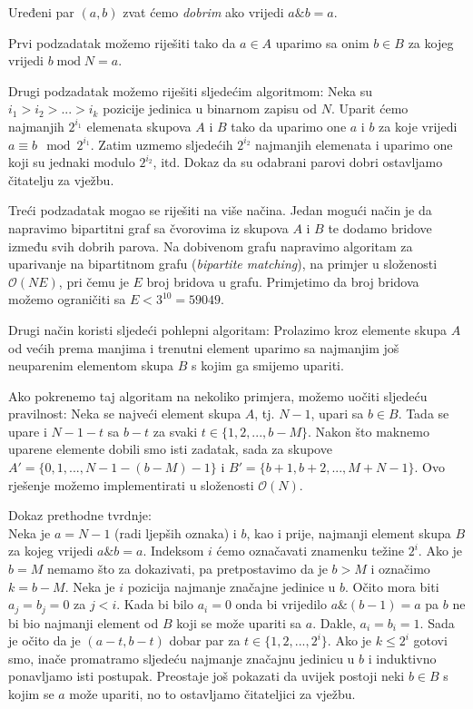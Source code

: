 \documentclass[a4paper]{article}
\begin{document}
Uređeni par $(a, b)$ zvat ćemo \emph{dobrim} ako vrijedi $a \mathbin\& b = a$.

Prvi podzadatak možemo riješiti tako da $a \in A$ uparimo sa onim $b \in B$ za
kojeg vrijedi $b \mathbin{\textrm{mod}} N = a$.

Drugi podzadatak možemo riješiti sljedećim algoritmom: Neka su
$i_1 > i_2 > ... > i_k$ pozicije jedinica u binarnom zapisu od $N$. Uparit ćemo
najmanjih $2^{i_1}$ elemenata skupova $A$ i $B$ tako da uparimo one $a$ i $b$
za koje vrijedi $a \equiv b \mod 2^{i_1}$. Zatim uzmemo sljedećih $2^{i_2}$
najmanjih elemenata i uparimo one koji su jednaki modulo $2^{i_2}$, itd.
Dokaz da su odabrani parovi dobri ostavljamo čitatelju za vježbu.

Treći podzadatak mogao se riješiti na više načina. Jedan mogući način je da
napravimo bipartitni graf sa čvorovima iz skupova $A$ i $B$ te dodamo bridove
između svih dobrih parova. Na dobivenom grafu napravimo algoritam za uparivanje
na bipartitnom grafu (\emph{bipartite matching}), na primjer u složenosti
$\mathcal{O}(NE)$, pri čemu je $E$ broj bridova u grafu.
Primjetimo da broj bridova možemo ograničiti sa $E < 3^{10} = 59049$.

Drugi način koristi sljedeći pohlepni algoritam: Prolazimo kroz elemente skupa
$A$ od većih prema manjima i trenutni element uparimo sa najmanjim još
neuparenim elementom skupa $B$ s kojim ga smijemo upariti.

Ako pokrenemo taj algoritam na nekoliko primjera, možemo uočiti sljedeću
pravilnost: Neka se najveći element skupa $A$, tj. $N - 1$, upari sa $b \in B$.
Tada se upare i $N - 1 - t$ sa $b - t$ za svaki $t \in \{1, 2, ..., b - M\}$.
Nakon što maknemo uparene elemente dobili smo isti zadatak, sada za skupove
$A' = \{0, 1, ..., N - 1 - (b - M) - 1\}$ i
$B' = \{b + 1, b + 2, ..., M + N - 1\}$. Ovo rješenje možemo implementirati u
složenosti $\mathcal{O}(N)$.

Dokaz prethodne tvrdnje:\\
Neka je $a = N - 1$ (radi ljepših oznaka) i $b$, kao i prije, najmanji element
skupa $B$ za kojeg vrijedi $a \mathbin\& b = a$. Indeksom $i$ ćemo označavati znamenku
težine $2^i$. Ako je $b = M$ nemamo što za dokazivati, pa pretpostavimo da je
$b > M$ i označimo $k = b - M$. Neka je $i$ pozicija najmanje značajne jedinice u $b$.
Očito mora biti $a_j = b_j = 0$ za $j < i$. Kada bi bilo $a_i = 0$ onda bi vrijedilo
$a \mathbin\& (b - 1) = a$ pa $b$ ne bi bio najmanji element od $B$ koji se može upariti
sa $a$. Dakle, $a_i = b_i = 1$. Sada je očito da je $(a - t, b - t)$ dobar par za
$t \in \{1, 2, ..., 2^i\}$. Ako je $k \leq 2^i$ gotovi smo, inače promatramo sljedeću
najmanje značajnu jedinicu u $b$ i induktivno ponavljamo isti postupak.
Preostaje još pokazati da uvijek postoji neki $b \in B$ s kojim se $a$ može upariti, no
to ostavljamo čitateljici za vježbu.
\end{document}
